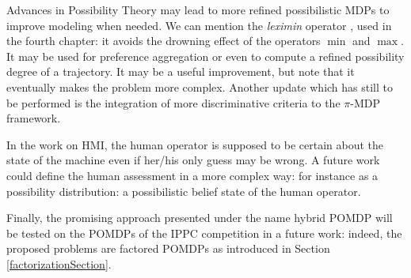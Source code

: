 Advances in Possibility Theory
may lead to more refined possibilistic MDPs
to improve modeling when needed.
We can mention the \textit{leximin} operator \cite{lexirefin},
used in the fourth chapter:
it avoids the drowning effect
of the operators $\min$ and $\max$.
It may be used for preference aggregation
or even to compute a refined possibility degree 
of a trajectory. 
It may be a useful improvement,
but note that it eventually makes 
the problem more complex.
Another update which has still to be performed
is the integration 
of more discriminative criteria 
\cite{LIP61723,conf/uai/GiangS01} 
to the $\pi$-MDP framework.

In the work on HMI, 
the human operator is supposed to be certain 
about the state of the machine 
even if her/his only guess may be wrong.
A future work could define 
the human assessment in a more complex way:
for instance as a possibility distribution:
a possibilistic belief state of the human operator.


Finally, the promising approach 
presented under the name hybrid POMDP
will be tested on the POMDPs 
of the IPPC competition \cite{SannerIPPC1111} in a future work:
indeed, the proposed problems
are factored POMDPs
as introduced in Section \ref{factorizationSection}.
